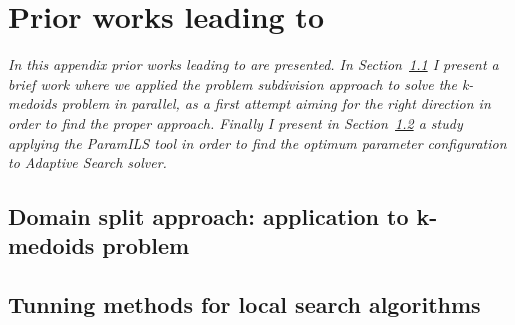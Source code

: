 \chapter{Prior works leading to \posl}
\label{chap:prior}
\textit{In this appendix prior works leading to \posl{} are presented. In Section~\ref{sec:split} I present a brief work where we applied the {\it problem subdivision} approach to solve the {\it k-medoids problem} in parallel, as a first attempt aiming for the right direction in order to find the proper approach. Finally I present in Section~\ref{sec:paramils} a study applying the {\sc ParamILS} tool in order to find the optimum parameter configuration to {\it Adaptive Search} solver.}

\vspace{2ex}\vfill
\minitoc
\newpage



%

\section{Domain split approach: application to k-medoids problem}
\label{sec:split}




\section{Tunning methods for local search algorithms}
\label{sec:paramils}

